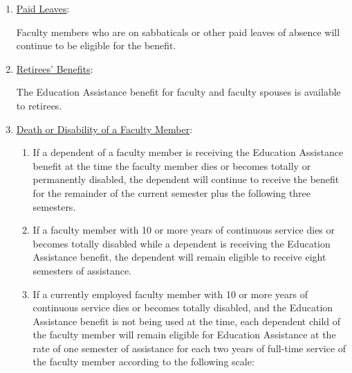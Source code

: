 \begin{enumerate}[label=\alph*)]
{\begin{enumerate}[label=\arabic*)]
						\end{enumerate}
					}

					\item{\underline{Paid Leaves}:

						Faculty members who are on sabbaticals or other paid
						leaves of absence will continue to be eligible for the
						benefit. }

					\item{\underline{Retirees' Benefits}:

						The Education Assistance benefit for faculty and faculty
						spouses is available to retirees.

					}


					\item{\underline{Death or Disability of a Faculty Member}:
						\begin{enumerate}[label=\arabic*)]

							\item{If a dependent of a faculty member is
								receiving the Education Assistance benefit at the
								time the faculty member dies or becomes totally or
								permanently disabled, the dependent will continue to
								receive the benefit for the remainder of the current
								semester plus the following three semesters.}

							\item{If a faculty member with 10 or more years of
								continuous service dies or becomes totally disabled
								while a dependent is receiving the Education
								Assistance benefit, the dependent will remain
								eligible to receive eight semesters of
								assistance.}

							\item{If a currently employed faculty member with 10
								or more years of continuous service dies or becomes
								totally disabled, and the Education Assistance
								benefit is not being used at the time, each
								dependent child of the faculty member will remain
								eligible for Education Assistance at the rate of one
								semester of assistance for each two years of
								full-time service of the faculty member according to
								the following scale:

}
\end{enumerate}}
\end{enumerate}
